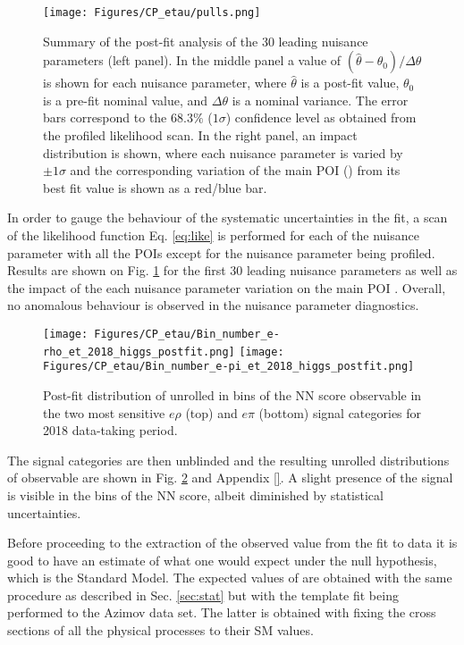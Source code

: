 \begin{figure}[h!]
    \centering
    \texttt{[image: Figures/CP\_etau/pulls.png]}
    \caption{Summary of the post-fit analysis of the 30 leading nuisance parameters (left panel). In the middle panel a value of $(\hat{\theta} - \theta_0)/\Delta\theta$ is shown for each nuisance parameter, where $\hat{\theta}$ is a post-fit value, $\theta_0$ is a pre-fit nominal value, and $\Delta\theta$ is a nominal variance. The error bars correspond to the $68.3\%$ ($1\sigma$) confidence level as obtained from the profiled likelihood scan. In the right panel, an impact distribution is shown, where each nuisance parameter is varied by $\pm1\sigma$ and the corresponding variation of the main POI (\mixa) from its best fit value is shown as a red/blue bar.}
    \label{fig:pulls}
\end{figure}

In order to gauge the behaviour of the systematic uncertainties in the fit, a scan of the likelihood function Eq. \ref{eq:like} is performed for each of the nuisance parameter with all the POIs except for the nuisance parameter being profiled. Results are shown on Fig. \ref{fig:pulls} for the first 30 leading nuisance parameters as well as the impact of the each nuisance parameter variation on the main POI \mixa. Overall, no anomalous behaviour is observed in the nuisance parameter diagnostics.  

\begin{figure}[h!]
    \centering
    \texttt{[image: Figures/CP\_etau/Bin\_number\_e-rho\_et\_2018\_higgs\_postfit.png]}
    \texttt{[image: Figures/CP\_etau/Bin\_number\_e-pi\_et\_2018\_higgs\_postfit.png]}
    \caption{Post-fit distribution of unrolled in bins of the NN score \phicp observable in the two most sensitive $e\rho$ (top) and $e\pi$ (bottom) signal categories for 2018 data-taking period.}
    \label{fig:sig_cat_postfit}
\end{figure}


The signal categories are then unblinded and the resulting unrolled distributions of \phicp observable are shown in Fig. \ref{fig:sig_cat_postfit} and Appendix \ref{}. A slight presence of the \htt signal is visible in the bins of the NN score, albeit diminished by statistical uncertainties. 

Before proceeding to the extraction of the observed \mixa value from the fit to data it is good to have an estimate of what one would expect under the null hypothesis, which is the Standard Model. The expected values of \mixa are obtained with the same procedure as described in Sec. \ref{sec:stat} but with the template fit being performed to the Azimov data set. The latter is obtained with fixing the cross sections of all the physical processes to their SM values. 

